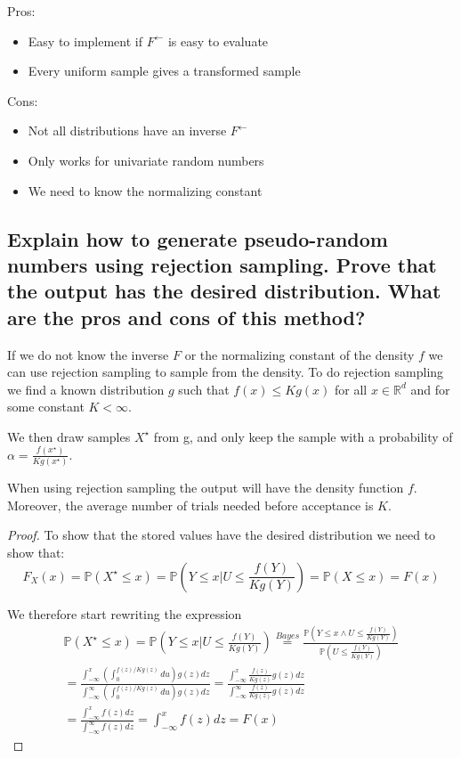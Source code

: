 \documentclass[a4paper]{article}
\begin{document}
Pros:
\begin{itemize}
    \item Easy to implement if $F^\leftarrow$ is easy to evaluate
    \item Every uniform sample gives a transformed sample 
\end{itemize}

Cons:
\begin{itemize}
    \item Not all distributions have an inverse $F^\leftarrow$
    \item Only works for univariate random numbers
    \item We need to know the normalizing constant
\end{itemize}

\newpage
\subsection[Rejection Sampling]{Explain how to generate pseudo-random numbers using rejection sampling. Prove that the output has the desired distribution. What are the pros and cons of this method?}

If we do not know the inverse $F$ or the normalizing constant of the density $f$ we can use rejection sampling to sample from the density. To do rejection sampling we find a known distribution $g$ such that $f(x) \leq Kg(x)$ for all $x\in\mathbb{R}^d$ and for some constant $K < \infty$.

We then draw samples $X^\star$ from g, and only keep the sample with a probability of $\alpha = \frac{f(x^\star)}{Kg(x^\star)}$.

When using rejection sampling the output will have the density function $f$. Moreover, the average number of trials needed before acceptance is $K$.

\begin{proof}
    To show that the stored values have the desired distribution we need to show that:
    \begin{equation}
        F_X(x) = \mathbb{P}(X^\star\leq x) = \mathbb{P}\left(Y\leq x | U\leq \frac{f(Y)}{Kg(Y)}\right) = \mathbb{P}(X\leq x) = F(x) 
    \end{equation}

    We therefore start rewriting the expression
    \begin{equation}
        \begin{gathered}
            \mathbb{P}(X^\star \leq x) = \mathbb{P}\left(Y\leq x | U\leq \frac{f(Y)}{Kg(Y)}\right) \overset{Bayes}{=}\frac{\mathbb{P}\left(Y\leq x\wedge U \leq \frac{f(Y)}{Kg(Y)}\right)}{\mathbb{P}\left(U\leq \frac{f(Y)}{Kg(Y)}\right)} \\
            = \frac{\int_{-\infty}^x\left(\int_0^{f(z)/Kg(z)}du \right) g(z)dz}{\int_{-\infty}^\infty\left(\int_0^{f(z)/Kg(z)}du \right) g(z)dz} = \frac{\int_{-\infty}^x\frac{f(z)}{Kg(z)}g(z)dz}{\int_{-\infty}^\infty\frac{f(z)}{Kg(z)}g(z)dz} \\
            = \frac{\int_{-\infty}^xf(z)dz}{\int_{-\infty}^\infty f(z)dz} = \int_{-\infty}^xf(z)dz = F(x)
        \end{gathered}
    \end{equation}
\end{proof}
\end{document}
